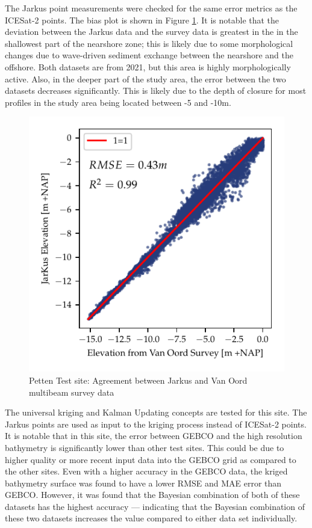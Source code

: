 The Jarkus point measurements were checked for the same error metrics as the ICESat-2 points. The bias plot is shown in Figure \ref{fig:petten-bias-plot}. It is notable that the deviation between the Jarkus data and the survey data is greatest in the in the shallowest part of the nearshore zone; this is likely due to some morphological changes due to wave-driven sediment exchange between the nearshore and the offshore. Both datasets are from 2021, but this area is highly morphologically active. Also, in the deeper part of the study area, the error  between the two datasets decreases significantly. This is likely due to the depth of closure for most profiles in the study area being located between -5 and -10m.

\begin{figure}[h]
    \centering
    \includegraphics{figures/petten_lidar_estimated_vs_truth.pdf}
    \caption{Petten Test site: Agreement between Jarkus and Van Oord multibeam survey data}
    \label{fig:petten-bias-plot}
\end{figure}

The universal kriging and Kalman Updating concepts are tested for this site. The Jarkus points are used as input to the kriging process instead of ICESat-2 points. It is notable that in this site, the error between GEBCO and the high resolution bathymetry is significantly lower than other test sites. This could be due to higher quality or more recent input data into the GEBCO grid as compared to the other sites. Even with a higher accuracy in the GEBCO data, the kriged bathymetry surface was found to have a lower RMSE and MAE error than GEBCO. However, it was found that the Bayesian combination of both of these datasets has the highest accuracy --- indicating that the Bayesian combination of these two datasets increases the value compared to either data set individually.

